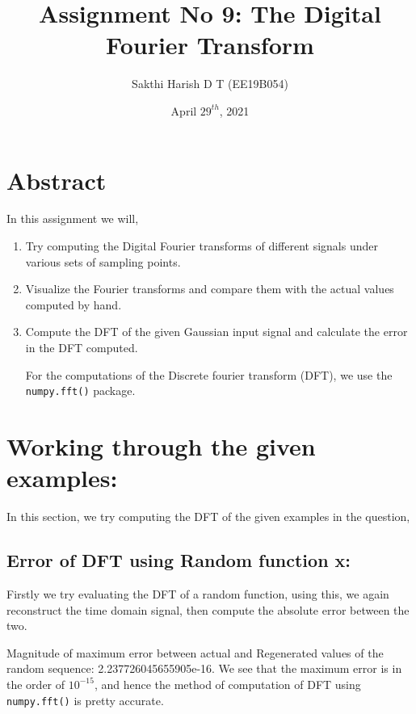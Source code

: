 \documentclass[11pt, a4paper]{article}
\title{Assignment No 9: The Digital Fourier Transform}
\author{Sakthi Harish D T (EE19B054)}
\date{April $29^{th}$, 2021}
\begin{document}
		

\maketitle 
\section*{Abstract}
In this assignment we will,
\begin{enumerate}
    \item Try computing the Digital Fourier transforms of different signals under various sets of sampling points.
    \item Visualize the Fourier transforms and compare them with the actual values computed by hand.
    \item Compute the DFT of the given Gaussian input signal and calculate the error in the DFT computed. 
    
For the computations of the Discrete fourier transform (DFT), we use the \texttt{numpy.fft()} package.
\end{enumerate}

\section{Working through the given examples:}
In this section, we try computing the DFT of the given examples in the question,
\subsection{Error of DFT using Random function x:}
Firstly we try evaluating the DFT of a random function, using this, we again reconstruct the time domain signal, then compute the absolute error between the two.

Magnitude of maximum error between actual and Regenerated values of the random sequence: 2.237726045655905e-16. We see that the maximum error is in the order of $10^{-15}$, and hence the method of computation of DFT using \texttt{numpy.fft()} is pretty accurate.
\end{document}
